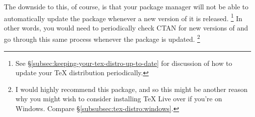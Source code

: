 The downside to this, of course, is that your package manager will not be able to automatically update the  package whenever a new version of it is released.%
\footnote{%
See \S\ref{subsec:keeping-your-tex-distro-up-to-date} for discussion of how to update your \TeX{} distribution periodically.
}
In other words, you would need to periodically check CTAN for new versions of  and go through this same process whenever the package is updated.%
\footnote{%
I would highly recommend this package, and so this might be another reason why you might wish to consider installing TeX Live over  if you're on Windows. Compare \S\ref{subsubsec:tex-distro:windows}.%
}